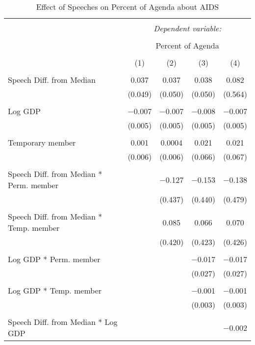
\begin{table}[!htbp] \centering 
  \caption{Effect of Speeches on Percent of Agenda about  AIDS} 
  \label{} 
\begin{tabular}{@{\extracolsep{5pt}}lcccc} 
\\[-1.8ex]\hline 
\hline \\[-1.8ex] 
 & \multicolumn{4}{c}{\textit{Dependent variable:}} \\ 
\cline{2-5} 
\\[-1.8ex] & \multicolumn{4}{c}{Percent of Agenda} \\ 
\\[-1.8ex] & (1) & (2) & (3) & (4)\\ 
\hline \\[-1.8ex] 
 Speech Diff. from Median & 0.037 & 0.037 & 0.038 & 0.082 \\ 
  & (0.049) & (0.050) & (0.050) & (0.564) \\ 
  & & & & \\ 
 Log GDP & $-$0.007 & $-$0.007 & $-$0.008 & $-$0.007 \\ 
  & (0.005) & (0.005) & (0.005) & (0.005) \\ 
  & & & & \\ 
 Temporary member & 0.001 & 0.0004 & 0.021 & 0.021 \\ 
  & (0.006) & (0.006) & (0.066) & (0.067) \\ 
  & & & & \\ 
 Speech Diff. from Median * Perm. member &  & $-$0.127 & $-$0.153 & $-$0.138 \\ 
  &  & (0.437) & (0.440) & (0.479) \\ 
  & & & & \\ 
 Speech Diff. from Median * Temp. member &  & 0.085 & 0.066 & 0.070 \\ 
  &  & (0.420) & (0.423) & (0.426) \\ 
  & & & & \\ 
 Log GDP * Perm. member &  &  & $-$0.017 & $-$0.017 \\ 
  &  &  & (0.027) & (0.027) \\ 
  & & & & \\ 
 Log GDP * Temp. member &  &  & $-$0.001 & $-$0.001 \\ 
  &  &  & (0.003) & (0.003) \\ 
  & & & & \\ 
 Speech Diff. from Median * Log GDP &  &  &  & $-$0.002 \\ 

\end{tabular}
\end{table}
